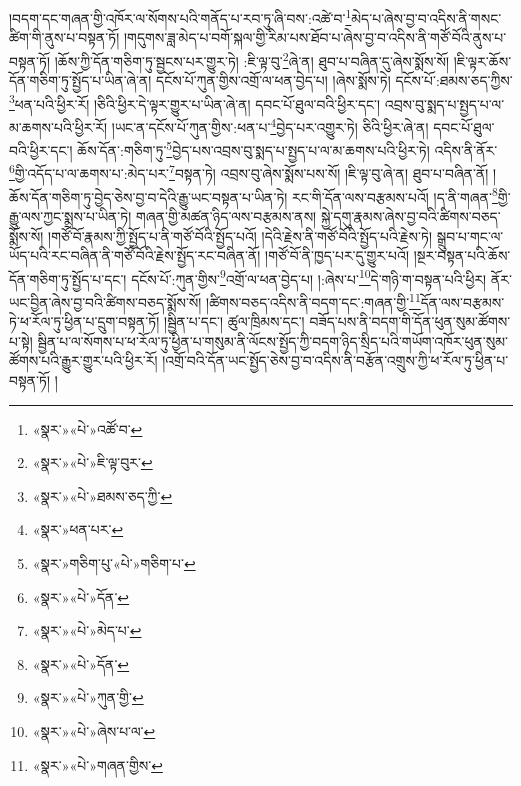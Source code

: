 །བདག་དང་གཞན་གྱི་འཁོར་ལ་སོགས་པའི་གནོད་པ་རབ་ཏུ་ཞི་བས་:འཚེ་བ་\footnote{«སྣར་»«པེ་»འཚོ་བ་}མེད་པ་ཞེས་བྱ་བ་འདིས་ནི་གསང་ཚིག་གི་ནུས་པ་བསྟན་ཏོ། །གདུགས་ཟླ་མེད་པ་བགོ་སྐལ་གྱི་རིམ་པས་ཐོབ་པ་ཞེས་བྱ་བ་འདིས་ནི་གཙོ་བོའི་ནུས་པ་བསྟན་ཏོ། །ཆོས་ཀྱི་དོན་གཅིག་ཏུ་སྦྱངས་པར་གྱུར་ཏེ། :ཇི་ལྟ་བུ་\footnote{«སྣར་»«པེ་»ཇི་ལྟ་བུར་}ཞེ་ན། ཐུབ་པ་བཞིན་དུ་ཞེས་སྨོས་སོ། །ཇི་ལྟར་ཆོས་དོན་གཅིག་ཏུ་སྤྱོད་པ་ཡིན་ཞེ་ན། དངོས་པོ་ཀུན་གྱིས་འགྲོ་ལ་ཕན་བྱེད་པ། །ཞེས་སྨོས་ཏེ། དངོས་པོ་:ཐམས་ཅད་ཀྱིས་\footnote{«སྣར་»«པེ་»ཐམས་ཅད་ཀྱི་}ཕན་པའི་ཕྱིར་རོ། །ཅིའི་ཕྱིར་དེ་ལྟར་གྱུར་པ་ཡིན་ཞེ་ན། དབང་པོ་ཐུལ་བའི་ཕྱིར་དང་། འབྲས་བུ་སྨད་པ་སྤྱད་པ་ལ་མ་ཆགས་པའི་ཕྱིར་རོ། །ཡང་ན་དངོས་པོ་ཀུན་གྱིས་:ཕན་པ་\footnote{«སྣར་»ཕན་པར་}བྱེད་པར་འགྱུར་ཏེ། ཅིའི་ཕྱིར་ཞེ་ན། དབང་པོ་ཐུལ་བའི་ཕྱིར་དང་། ཆོས་དོན་:གཅིག་ཏུ་\footnote{«སྣར་»གཅིག་པུ་«པེ་»གཅིག་པ་}བྱེད་པས་འབྲས་བུ་སྨད་པ་སྤྱད་པ་ལ་མ་ཆགས་པའི་ཕྱིར་ཏེ། འདིས་ནི་ནོར་\footnote{«སྣར་»«པེ་»དོན་}གྱི་འདོད་པ་ལ་ཆགས་པ་:མེད་པར་\footnote{«སྣར་»«པེ་»མེད་པ་}བསྟན་ཏེ། འབྲས་བུ་ཞེས་སྨོས་པས་སོ། །ཇི་ལྟ་བུ་ཞེ་ན། ཐུབ་པ་བཞིན་ནོ། །ཆོས་དོན་གཅིག་ཏུ་བྱེད་ཅེས་བྱ་བ་དེའི་རྒྱུ་ཡང་བསྟན་པ་ཡིན་ཏེ། རང་གི་དོན་ལས་བརྩམས་པའོ། །ད་ནི་གཞན་\footnote{«སྣར་»«པེ་»དོན་}གྱི་རྒྱུ་ལས་ཀྱང་སྨྲས་པ་ཡིན་ཏེ། གཞན་གྱི་མཚན་ཉིད་ལས་བརྩམས་ནས། སྐྱེ་དགུ་རྣམས་ཞེས་བྱ་བའི་ཚིགས་བཅད་སྨོས་སོ། །གཙོ་བོ་རྣམས་ཀྱི་སྤྱོད་པ་ནི་གཙོ་བོའི་སྤྱོད་པའོ། །དེའི་རྗེས་ནི་གཙོ་བོའི་སྤྱོད་པའི་རྗེས་ཏེ། སྒྲུབ་པ་གང་ལ་ཡོད་པའི་རང་བཞིན་ནི་གཙོ་བོའི་རྗེས་སྤྱོད་རང་བཞིན་ནོ། །གཙོ་བོ་ནི་ཁྱད་པར་དུ་གྱུར་པའོ། །སྔར་བསྟན་པའི་ཆོས་དོན་གཅིག་ཏུ་སྤྱོད་པ་དང་། དངོས་པོ་:ཀུན་གྱིས་\footnote{«སྣར་»«པེ་»ཀུན་གྱི་}འགྲོ་ལ་ཕན་བྱེད་པ། །:ཞེས་པ་\footnote{«སྣར་»«པེ་»ཞེས་པ་ལ་}དེ་གཉི་ག་བསྟན་པའི་ཕྱིར། ནོར་ཡང་བྱིན་ཞེས་བྱ་བའི་ཚིགས་བཅད་སྨོས་སོ། །ཚིགས་བཅད་འདིས་ནི་བདག་དང་:གཞན་གྱི་\footnote{«སྣར་»«པེ་»གཞན་གྱིས་}དོན་ལས་བརྩམས་ཏེ་ཕ་རོལ་ཏུ་ཕྱིན་པ་དྲུག་བསྟན་ཏོ། །སྦྱིན་པ་དང་། ཚུལ་ཁྲིམས་དང་། བཟོད་པས་ནི་བདག་གི་དོན་ཕུན་སུམ་ཚོགས་པ་སྟེ། སྦྱིན་པ་ལ་སོགས་པ་ཕ་རོལ་ཏུ་ཕྱིན་པ་གསུམ་ནི་ལོངས་སྤྱོད་ཀྱི་བདག་ཉིད་སྲིད་པའི་གཡོག་འཁོར་ཕུན་སུམ་ཚོགས་པའི་རྒྱུར་གྱུར་པའི་ཕྱིར་རོ། །འགྲོ་བའི་དོན་ཡང་སྤྱོད་ཅེས་བྱ་བ་འདིས་ནི་བརྩོན་འགྲུས་ཀྱི་ཕ་རོལ་ཏུ་ཕྱིན་པ་བསྟན་ཏོ། །
